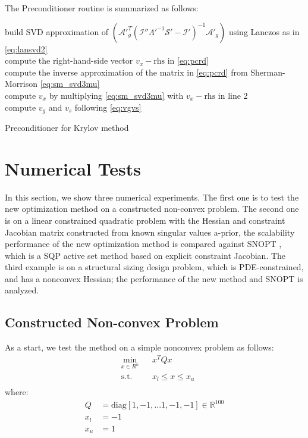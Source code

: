 \documentclass{article}
\theoremstyle{definition}
\begin{document}
The Preconditioner routine is summarized as follows: 
\begin{algorithm}

\BlankLine
build SVD approximation of $ \left(\mathcal{A}'^T_g \left( \mathcal{I}'' \Lambda'^{-1} \mathcal{S}' - \mathcal{I}'\right)^{-1} \mathcal{A}'_g \right)$ using Lanczos as in \eqref{eq:lansvd2}\\
compute the right-hand-side vector $v_x-\textrm{rhs}$ in \eqref{eq:pcrd} \\
compute the inverse approximation of the matrix in \eqref{eq:pcrd} from Sherman-Morrison \eqref{eq:sm_svd3mu}\\
compute $v_x$ by multiplying \eqref{eq:sm_svd3mu} with $v_x-\textrm{rhs}$ in line 2 \\ 
compute $v_g$ and $v_s$ following \eqref{eq:vgvs}
\caption{Preconditioner for Krylov method}
\end{algorithm}

\section{Numerical Tests}
In this section, we show three numerical experiments. The first one is to test the new optimization method on a constructed non-convex problem. The second one is on a linear constrained quadratic problem with the Hessian and constraint Jacobian matrix constructed from known singular values a-prior, the scalability performance of the new optimization method is compared against SNOPT \cite{gill:2002}, which is a SQP active set method based on explicit constraint Jacobian. The third example is on a structural sizing design problem, which is PDE-constrained, and has a nonconvex Hessian; the performance of the new method and SNOPT is analyzed.     

\subsection{Constructed Non-convex Problem}
As a start, we test the method on a simple nonconvex problem as follows:
\begin{equation*}
\begin{aligned}
&\underset{x \in R^n} {\text{min}}  
& & x^T Q x \\
& {\text{s.t.}}  & & x_l \leq x \leq x_u \\
\end{aligned}
\end{equation*}
where:
\begin{equation*}
\begin{aligned}
Q &= \textrm{diag} [1, -1, ... 1, -1, -1] \in \mathbb{R}^{100} \\
x_l &= -1 \\
x_u &= 1 
\end{aligned}
\end{equation*}
\end{document}
